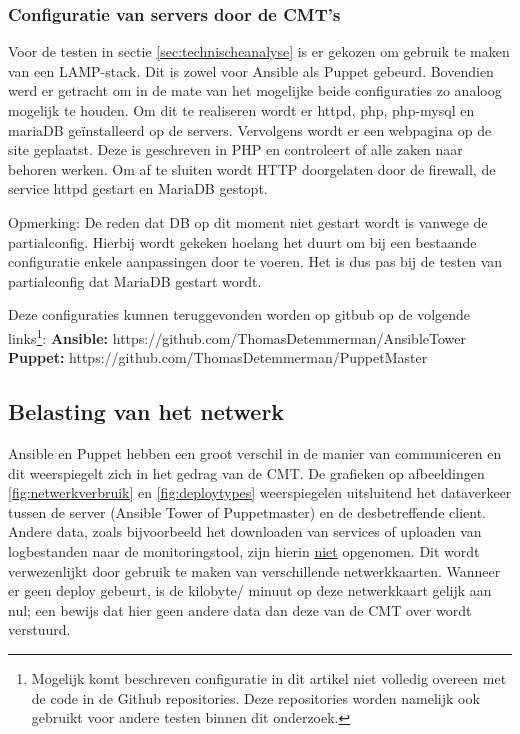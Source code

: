 
\subsubsection{Configuratie van servers door de CMT's }


Voor de testen in sectie \ref{sec:technischeanalyse} is er gekozen om gebruik te maken van een LAMP-stack. Dit is zowel voor Ansible als Puppet gebeurd. Bovendien werd er getracht om in de mate van het mogelijke beide configuraties zo analoog mogelijk te houden. Om dit te realiseren wordt er httpd, php, php-mysql en mariaDB ge\"installeerd op de servers. Vervolgens wordt er een webpagina op de site geplaatst. Deze is geschreven in PHP en controleert of alle zaken naar behoren werken. Om af te sluiten wordt HTTP doorgelaten door de firewall, de service httpd gestart en MariaDB gestopt. 

Opmerking: De reden dat DB op dit moment niet gestart wordt is vanwege de \gls{partialconfig}. Hierbij wordt gekeken hoelang het duurt om bij een bestaande configuratie enkele aanpassingen door te voeren. Het is dus pas bij de testen van \gls{partialconfig} dat MariaDB gestart wordt.


Deze configuraties kunnen teruggevonden worden op gitbub op de volgende links\footnote{Mogelijk komt beschreven configuratie in dit artikel niet volledig overeen met de code in de Github repositories. Deze repositories worden namelijk ook gebruikt voor andere testen  binnen dit onderzoek.}:\newline
\textbf{Ansible:} https://github.com/ThomasDetemmerman/AnsibleTower \newline
\textbf{Puppet:} https://github.com/ThomasDetemmerman/PuppetMaster


\subsection{Belasting van het netwerk}
Ansible en Puppet hebben een groot verschil in de manier van communiceren en dit weerspiegelt zich in het gedrag van de \gls{CMT}. De grafieken op afbeeldingen \ref{fig:netwerkverbruik} en \ref{fig:deploytypes} weerspiegelen uitsluitend het dataverkeer tussen de server (Ansible Tower of Puppetmaster) en de desbetreffende client. Andere data, zoals bijvoorbeeld het downloaden van services of uploaden van logbestanden naar de monitoringstool, zijn hierin \underline{niet} opgenomen. Dit wordt verwezenlijkt door gebruik te maken van verschillende netwerkkaarten. Wanneer er geen deploy gebeurt, is de kilobyte/ minuut op deze netwerkkaart gelijk aan nul; een bewijs dat hier geen andere data dan deze van de \gls{CMT} over wordt verstuurd.  
	
